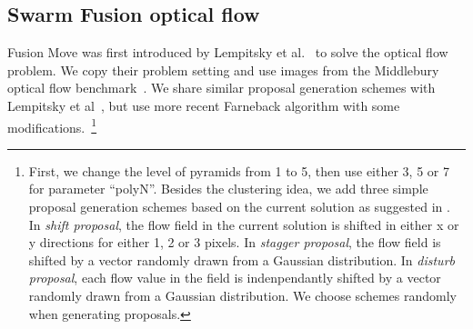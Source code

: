 \subsection{Swarm Fusion optical flow}

Fusion Move was first introduced by Lempitsky et al.~\cite{fusion_flow} to
solve the optical flow problem.
We copy their problem setting and use images from the Middlebury optical
flow benchmark~\cite{middlebury_optical_flow}. We share similar proposal
generation schemes with Lempitsky et al~\cite{fusion_flow}, but
use more recent Farneback algorithm with some modifications.~\footnote{First, we
change the level of pyramids from 1 to 5, then use either 3, 5 or 7 for
parameter ``polyN''. Besides the clustering idea, we add three simple
proposal generation schemes based on the current solution as suggested
in \cite{fusion_flow}. In \textit{shift proposal}, the flow field in the
current solution is shifted in either x or y directions for
either 1, 2 or 3 pixels. In \textit{stagger proposal}, the flow field is
shifted by a vector randomly drawn from a Gaussian distribution. In
\textit{disturb proposal}, each flow value in the field is
indenpendantly shifted by a vector randomly drawn from a Gaussian
distribution. We choose schemes randomly when generating proposals.}



